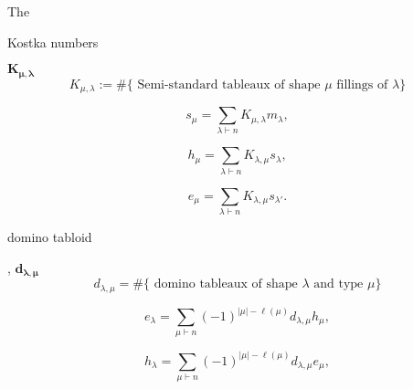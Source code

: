 \documentclass[12pt]{amsart}
\begin{document}
\vspace{-10pt}
\begin{mdframed}[linecolor=red!20,linewidth=3pt,innertopmargin=8pt]
	The \begin{bf}Kostka numbers\end{bf} $\bm{K_{\mu,\lambda}}$
	\vspace{-5pt}
	\begin{equation}K_{\mu,\lambda}:=\#\{\text{ Semi-standard tableaux of shape }\mu\text{ fillings of }\lambda\}\end{equation}
	\begin{minipage}[t]{4.75cm}
		\begin{equation} s_\mu=\sum_{\lambda\vdash n} K_{\mu,\lambda}m_\lambda,
		\end{equation}
	\end{minipage}
	\begin{minipage}[t]{4.75cm}
		\begin{equation} h_\mu=\sum_{\lambda\vdash n} K_{\lambda,\mu}s_\lambda,
		\end{equation}
	\end{minipage}
	\begin{minipage}[t]{4.75cm}
		\begin{equation} e_\mu=\sum_{\lambda\vdash n} K_{\lambda,\mu}s_{\lambda'}.
		\end{equation}
	\end{minipage}

\end{mdframed}

\vspace{-10pt}
\begin{mdframed}[linecolor=cyan!20,linewidth=3pt,innertopmargin=8pt]
	\begin{bf}domino tabloid\end{bf}, $\bm{d_{\lambda,\mu}}$ 
	\begin{equation}d_{\lambda,\mu}=\#\{\text{ domino tableaux of shape }\lambda\text{ and type }\mu\}
	\end{equation}
	\begin{minipage}[t]{7cm}
		\begin{equation} e_\lambda=\sum_{\mu\vdash n} (-1)^{|\mu|-\ell(\mu)}d_{\lambda,\mu}h_\mu,
		\end{equation}
	\end{minipage}
	\begin{minipage}[t]{7cm}
		\begin{equation} h_\lambda=\sum_{\mu\vdash n} (-1)^{|\mu|-\ell(\mu)}d_{\lambda,\mu}e_\mu,
		\end{equation}
	\end{minipage}

\end{mdframed}
\end{document}
